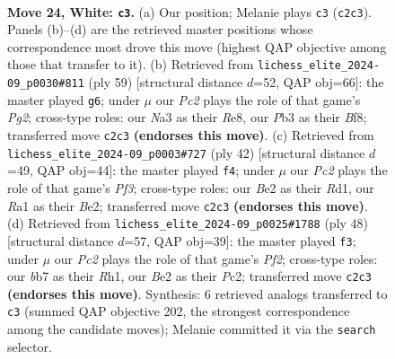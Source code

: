 \documentclass[11pt]{article}
\begin{document}
\clearpage

\begin{figure}[p]\centering
\begin{subfigure}{0.46\textwidth}\centering
\resizebox{\linewidth}{!}{%
\newchessgame
\chessboard[
  setfen={r5k1/pbpp4/1p5p/5pp1/1n6/NP3PP1/P1PPBK1P/R7 w - - 6 24},
  showmover=false,
  pgfstyle=straightmove, color=movearrow, markmove={c2-c3}
]}
\caption{}
\end{subfigure}\hfill
\begin{subfigure}{0.46\textwidth}\centering
\resizebox{\linewidth}{!}{%
\newchessgame
\chessboard[
  setfen={2k1rb2/p1p3p1/1p3p1p/5N2/2P2n1P/1PB5/P4PP1/3R1K2 b - - 0 30},
  showmover=false,
  pgfstyle=straightmove, color=movearrow, markmove={g7-g6}
]}
\caption{}
\end{subfigure}
\\[4pt]
\begin{subfigure}{0.46\textwidth}\centering
\resizebox{\linewidth}{!}{%
\newchessgame
\chessboard[
  setfen={r4k2/pb3p2/1p2p2p/1N2n1p1/8/P3PPP1/1P2BK1P/3R4 w - - 1 22},
  showmover=false,
  pgfstyle=straightmove, color=movearrow, markmove={f3-f4}
]}
\caption{}
\end{subfigure}\hfill
\begin{subfigure}{0.46\textwidth}\centering
\resizebox{\linewidth}{!}{%
\newchessgame
\chessboard[
  setfen={3r2k1/pp3p2/2p1b1p1/7p/4P1n1/1PN3P1/P1P2PB1/6KR w - - 1 25},
  showmover=false,
  pgfstyle=straightmove, color=movearrow, markmove={f2-f3}
]}
\caption{}
\end{subfigure}
\caption{\textbf{Move 24, White: \texttt{c3}.} (a) Our position; Melanie plays \texttt{c3} (\texttt{c2c3}). Panels (b)--(d) are the retrieved master positions whose correspondence most drove this move (highest QAP objective among those that transfer to it). (b) Retrieved from \texttt{lichess\_elite\_2024-09\_p0030\#811} (ply 59) [structural distance $d$=52, QAP obj=66]: the master played \texttt{g6}; under $\mu$ our \emph{Pc2} plays the role of that game's \emph{Pg2}; cross-type roles: our \emph{N}a3 as their \emph{R}e8, our \emph{P}b3 as their \emph{B}f8; transferred move \texttt{c2c3} \textbf{(endorses this move)}. (c) Retrieved from \texttt{lichess\_elite\_2024-09\_p0003\#727} (ply 42) [structural distance $d$=49, QAP obj=44]: the master played \texttt{f4}; under $\mu$ our \emph{Pc2} plays the role of that game's \emph{Pf3}; cross-type roles: our \emph{B}e2 as their \emph{R}d1, our \emph{R}a1 as their \emph{B}e2; transferred move \texttt{c2c3} \textbf{(endorses this move)}. (d) Retrieved from \texttt{lichess\_elite\_2024-09\_p0025\#1788} (ply 48) [structural distance $d$=57, QAP obj=39]: the master played \texttt{f3}; under $\mu$ our \emph{Pc2} plays the role of that game's \emph{Pf2}; cross-type roles: our \emph{b}b7 as their \emph{R}h1, our \emph{B}e2 as their \emph{P}c2; transferred move \texttt{c2c3} \textbf{(endorses this move)}. Synthesis: 6 retrieved analogs transferred to \texttt{c3} (summed QAP objective 202, the strongest correspondence among the candidate moves); Melanie committed it via the \texttt{search} selector.}
\label{fig:thought-m46}
\end{figure}
\end{document}

